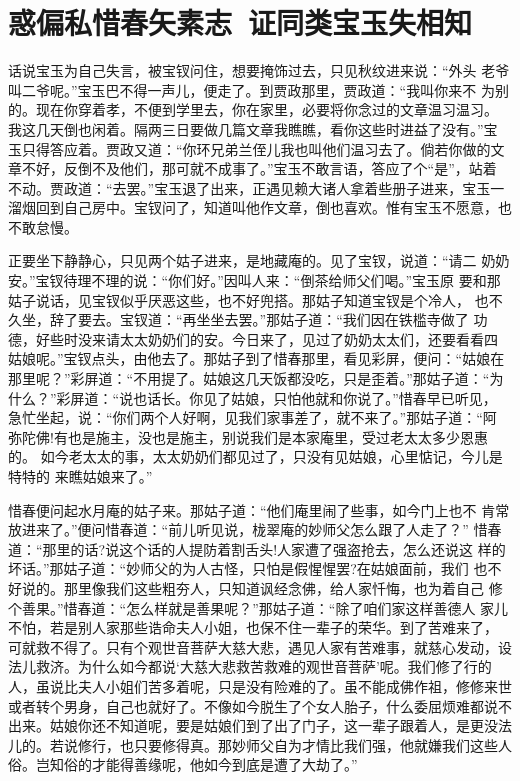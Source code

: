 \chapter{惑偏私惜春矢素志~证同类宝玉失相知}

话说宝玉为自己失言，被宝钗问住，想要掩饰过去，只见秋纹进来说：“外头
老爷叫二爷呢。”宝玉巴不得一声儿，便走了。到贾政那里，贾政道：“我叫你来不
为别的。现在你穿着孝，不便到学里去，你在家里，必要将你念过的文章温习温习。
我这几天倒也闲着。隔两三日要做几篇文章我瞧瞧，看你这些时进益了没有。”宝
玉只得答应着。贾政又道：“你环兄弟兰侄儿我也叫他们温习去了。倘若你做的文
章不好，反倒不及他们，那可就不成事了。”宝玉不敢言语，答应了个“是”，站着
不动。贾政道：“去罢。”宝玉退了出来，正遇见赖大诸人拿着些册子进来，宝玉一
溜烟回到自己房中。宝钗问了，知道叫他作文章，倒也喜欢。惟有宝玉不愿意，也
不敢怠慢。

正要坐下静静心，只见两个姑子进来，是地藏庵的。见了宝钗，说道：“请二
奶奶安。”宝钗待理不理的说：“你们好。”因叫人来：“倒茶给师父们喝。”宝玉原
要和那姑子说话，见宝钗似乎厌恶这些，也不好兜搭。那姑子知道宝钗是个冷人，
也不久坐，辞了要去。宝钗道：“再坐坐去罢。”那姑子道：“我们因在铁槛寺做了
功德，好些时没来请太太奶奶们的安。今日来了，见过了奶奶太太们，还要看看四
姑娘呢。”宝钗点头，由他去了。那姑子到了惜春那里，看见彩屏，便问：“姑娘在
那里呢？”彩屏道：“不用提了。姑娘这几天饭都没吃，只是歪着。”那姑子道：“为
什么？”彩屏道：“说也话长。你见了姑娘，只怕他就和你说了。”惜春早已听见，
急忙坐起，说：“你们两个人好啊，见我们家事差了，就不来了。”那姑子道：“阿
弥陀佛!有也是施主，没也是施主，别说我们是本家庵里，受过老太太多少恩惠的。
如今老太太的事，太太奶奶们都见过了，只没有见姑娘，心里惦记，今儿是特特的
来瞧姑娘来了。”

惜春便问起水月庵的姑子来。那姑子道：“他们庵里闹了些事，如今门上也不
肯常放进来了。”便问惜春道：“前儿听见说，栊翠庵的妙师父怎么跟了人走了？”
惜春道：“那里的话?说这个话的人提防着割舌头!人家遭了强盗抢去，怎么还说这
样的坏话。”那姑子道：“妙师父的为人古怪，只怕是假惺惺罢?在姑娘面前，我们
也不好说的。那里像我们这些粗夯人，只知道讽经念佛，给人家忏悔，也为着自己
修个善果。”惜春道：“怎么样就是善果呢？”那姑子道：“除了咱们家这样善德人
家儿不怕，若是别人家那些诰命夫人小姐，也保不住一辈子的荣华。到了苦难来了，
可就救不得了。只有个观世音菩萨大慈大悲，遇见人家有苦难事，就慈心发动，设
法儿救济。为什么如今都说‘大慈大悲救苦救难的观世音菩萨’呢。我们修了行的
人，虽说比夫人小姐们苦多着呢，只是没有险难的了。虽不能成佛作祖，修修来世
或者转个男身，自己也就好了。不像如今脱生了个女人胎子，什么委屈烦难都说不
出来。姑娘你还不知道呢，要是姑娘们到了出了门子，这一辈子跟着人，是更没法
儿的。若说修行，也只要修得真。那妙师父自为才情比我们强，他就嫌我们这些人
俗。岂知俗的才能得善缘呢，他如今到底是遭了大劫了。”

